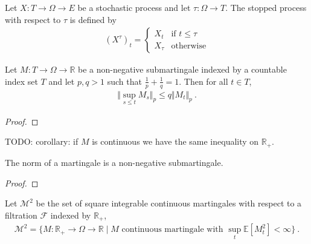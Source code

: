 \begin{definition}\label{def:stoppedProcess}
  \mathlibok
Let $X : T \to \Omega \to E$ be a stochastic process and let $\tau : \Omega \to T$.
The stopped process with respect to $\tau$ is defined by
\begin{align*}
  (X^{\tau})_t = \begin{cases}
    X_t & \text{if } t \le \tau \\
    X_{\tau} & \text{otherwise}
  \end{cases}
\end{align*}
\end{definition}


\begin{theorem}\label{thm:doob_lp}
Let $M : T \to \Omega \to \mathbb{R}$ be a non-negative submartingale indexed by a countable index set $T$ and let $p, q > 1$ such that $\frac{1}{p} + \frac{1}{q} = 1$.
Then for all $t \in T$,
\begin{align*}
  \Vert \sup_{s \le t} M_s \Vert_p
  \le q \Vert M_t \Vert_p
  \: .
\end{align*}
\end{theorem}

\begin{proof}

\end{proof}

TODO: corollary: if $M$ is continuous we have the same inequality on $\mathbb{R}_+$.


\begin{lemma}\label{lem:Martingale.submartingale_norm}
The norm of a martingale is a non-negative submartingale.
\end{lemma}

\begin{proof}

\end{proof}


\begin{definition}\label{def:squareIntegrableMartingales}
Let $\mathcal{M}^2$ be the set of square integrable continuous martingales with respect to a filtration $\mathcal{F}$ indexed by $\mathbb{R}_+$,
\begin{align*}
  \mathcal{M}^2
  = \{ M : \mathbb{R}_+ \to \Omega \to \mathbb{R} \mid M \text{ continuous martingale with } \sup_{t}\mathbb{E}[M_t^2] < \infty \}
  \: .
\end{align*}
\end{definition}


